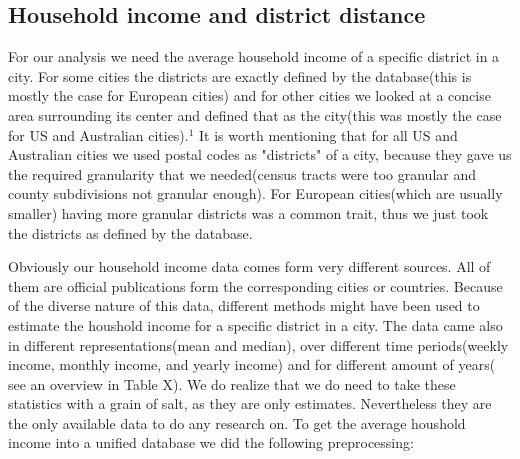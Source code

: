 \documentclass[a4paper, 10pt, conference]{ieeeconf}      %
\begin{document}
\subsection{Household income and district distance}
For our analysis we need the average household income of a specific district in a city. For some cities the districts are exactly
defined by the database(this is mostly the case for European cities) and for other cities we looked at a concise area surrounding 
its center and defined that as the city(this was mostly the case for US and Australian cities).$^{1}$ It is worth mentioning that 
for all US and Australian cities we used postal codes as "districts" of a city, because they gave us the required granularity that
we needed(census tracts were too granular and county subdivisions not granular enough). For European cities(which are usually smaller)
having more granular districts was a common trait, thus we just took the districts as defined by the database. 

Obviously our household income data comes form very different sources. All of them are official publications form the corresponding 
cities or countries. Because of the diverse nature of this data, different methods might have been used to estimate the houshold income
for a specific district in a city. The data came also in different representations(mean and median), over different time periods(weekly
income, monthly income, and yearly income) and for different amount of years( see an overview in Table X). We do realize that we do need
to take these statistics with a grain of salt, as they are only estimates. Nevertheless they are the only available data to do any research
on. To get the average houshold income into a unified database we did the following preprocessing: 
\end{document}

